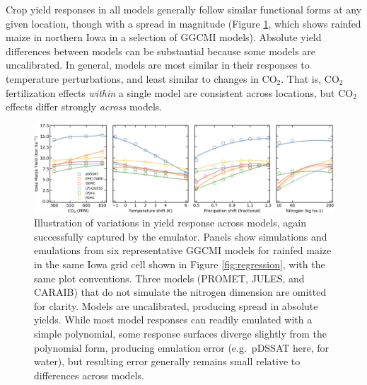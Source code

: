 \documentclass[gmdd]{copernicus} %
\begin{document}
Crop yield responses in all models generally follow similar functional forms at any given location, though with a spread in magnitude (Figure \ref{fig:regression_2}, which shows rainfed maize in northern Iowa in a selection of GGCMI models). 
Absolute yield differences between models can be substantial because some models are uncalibrated.
In general, models are most similar in their responses to temperature perturbations, and least similar to changes in CO$_2$. 
That is, CO$_2$ fertilization effects \textit{within} a single model are consistent across locations, but CO$_2$ effects differ strongly \textit{across} models. 

\begin{figure}[h!!]
\centering
    \includegraphics[width=16.3cm]{figures/regression_example_2.png}
    \caption{
    Illustration of variations in yield response across models, again successfully captured by the emulator. 
    Panels show simulations and emulations from six representative GGCMI models for rainfed maize in the same Iowa grid cell shown in Figure \ref{fig:regression}, with the same plot conventions. 
    Three models (PROMET, JULES, and CARAIB) that do not simulate the nitrogen dimension are omitted for clarity. 
    Models are uncalibrated, producing spread in absolute yields. 
    While most model responses can readily emulated with a simple polynomial, some response surfaces diverge slightly from the polynomial form, producing emulation error (e.g.\ pDSSAT here, for water), but 
    resulting error generally remains small relative to differences across models.
    }
   \label{fig:regression_2}
\end{figure}
\end{document}
